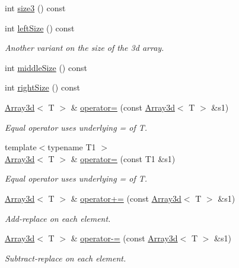 \begin{DoxyCompactItemize}
int \mbox{\hyperlink{classXMLArray_1_1Array3d_acd75aac75b08156dddab9c76dd3ebf33}{size3}} () const
\item 
int \mbox{\hyperlink{classXMLArray_1_1Array3d_a22b8137d2675f4e8f27d475abb217b7a}{left\+Size}} () const
\begin{DoxyCompactList}\small\item\em Another variant on the size of the 3d array. \end{DoxyCompactList}\item 
int \mbox{\hyperlink{classXMLArray_1_1Array3d_aa28ef386c7869c03b34f5a24a55bfde2}{middle\+Size}} () const
\item 
int \mbox{\hyperlink{classXMLArray_1_1Array3d_a19c4d18fb2ee0f0ee27631f0aa35ccdc}{right\+Size}} () const
\item 
\mbox{\hyperlink{classXMLArray_1_1Array3d}{Array3d}}$<$ T $>$ \& \mbox{\hyperlink{classXMLArray_1_1Array3d_a797bc6cb731b7e9a8fbe0bf72d87678e}{operator=}} (const \mbox{\hyperlink{classXMLArray_1_1Array3d}{Array3d}}$<$ T $>$ \&s1)
\begin{DoxyCompactList}\small\item\em Equal operator uses underlying = of T. \end{DoxyCompactList}\item 
{\footnotesize template$<$typename T1 $>$ }\\\mbox{\hyperlink{classXMLArray_1_1Array3d}{Array3d}}$<$ T $>$ \& \mbox{\hyperlink{classXMLArray_1_1Array3d_a64543f39150c0d468eb6bef6ea73c1c6}{operator=}} (const T1 \&s1)
\begin{DoxyCompactList}\small\item\em Equal operator uses underlying = of T. \end{DoxyCompactList}\item 
\mbox{\hyperlink{classXMLArray_1_1Array3d}{Array3d}}$<$ T $>$ \& \mbox{\hyperlink{classXMLArray_1_1Array3d_add116e7a7b9da853f2b463d5fb3a9b1e}{operator+=}} (const \mbox{\hyperlink{classXMLArray_1_1Array3d}{Array3d}}$<$ T $>$ \&s1)
\begin{DoxyCompactList}\small\item\em Add-\/replace on each element. \end{DoxyCompactList}\item 
\mbox{\hyperlink{classXMLArray_1_1Array3d}{Array3d}}$<$ T $>$ \& \mbox{\hyperlink{classXMLArray_1_1Array3d_a9d4e2f24b2d52634a926ec4fb758828b}{operator-\/=}} (const \mbox{\hyperlink{classXMLArray_1_1Array3d}{Array3d}}$<$ T $>$ \&s1)
\begin{DoxyCompactList}\small\item\em Subtract-\/replace on each element. \end{DoxyCompactList}\item 

\end{DoxyCompactItemize}

